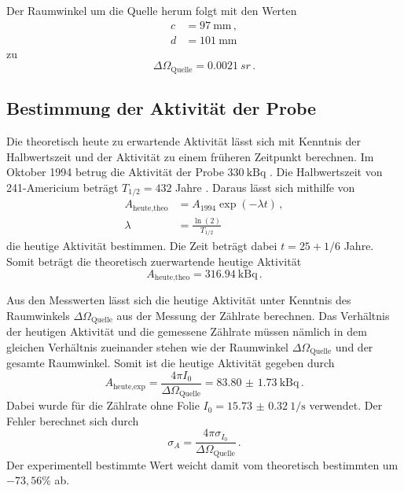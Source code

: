 Der Raumwinkel um die Quelle herum folgt mit den Werten \cite{Versuchsanleitung}
\begin{align*}
  c &= \SI{97}{\milli\meter} \,, \\
  d &= \SI{101}{\milli\meter}
\end{align*}
zu
\begin{equation*}
  \Delta \Omega_\text{Quelle} = \SI{0.0021}{sr} \,.
\end{equation*}

\newpage
\subsection{Bestimmung der Aktivität der Probe}
\label{subsec:aktivitaet}

Die theoretisch heute zu erwartende Aktivität lässt sich mit Kenntnis der Halbwertszeit
und der Aktivität zu einem früheren Zeitpunkt berechnen. Im Oktober 1994 betrug die
Aktivität der Probe $\SI{330}{\kilo\becquerel}$ \cite{Versuchsanleitung}. Die Halbwertszeit
von 241-Americium beträgt $T_{1/2}=432$ Jahre \cite{t12}. Daraus lässt sich mithilfe von
\begin{align*}
  A_{\text{heute,theo}}&= A_{1994}\exp(-\lambda t) \,, \\
  \lambda&= \frac{\ln(2)}{T_{1/2}}
\end{align*}
die heutige Aktivität bestimmen. Die Zeit beträgt dabei $t=25+1/6$ Jahre. Somit beträgt die
theoretisch zuerwartende heutige Aktivität
\begin{equation*}
  A_{\text{heute,theo}}= \SI{316.94}{\kilo\becquerel} \,.
\end{equation*}

Aus den Messwerten lässt sich die heutige Aktivität unter
Kenntnis des Raumwinkels $\Delta \Omega_{\text{Quelle}}$ aus der Messung der Zählrate berechnen.
Das Verhältnis der heutigen Aktivität und die gemessene Zählrate müssen nämlich in
dem gleichen Verhältnis zueinander stehen wie der Raumwinkel $\Delta \Omega_{\text{Quelle}}$ und
der gesamte Raumwinkel. Somit ist die heutige Aktivität gegeben durch
\begin{equation*}
  A_{\text{heute,exp}}=\frac{4 \pi  I_0}{\Delta \Omega_{\text{Quelle}}}=\SI{83.80(173)}{\kilo\becquerel} \,.
\end{equation*}
Dabei wurde für die Zählrate ohne Folie $I_0=\SI{15.73(032)}{1 \per\second}$ verwendet.
Der Fehler berechnet sich durch
\begin{equation*}
  \sigma_A=\frac{4 \pi  \sigma_{I_0}}{\Delta \Omega_{\text{Quelle}}} \,.
\end{equation*}
Der experimentell bestimmte Wert weicht damit vom theoretisch bestimmten um
$-73{,}56\%$ ab.

